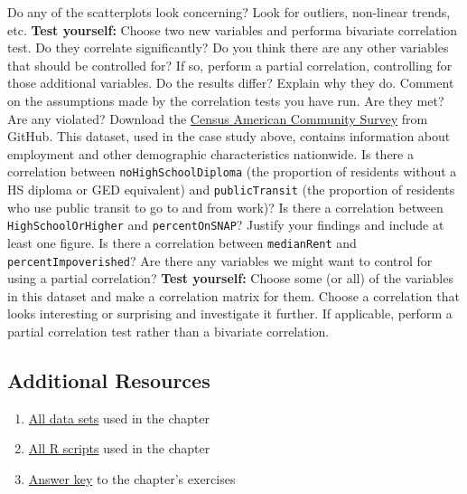 Do any of the scatterplots look concerning? Look for outliers, non-linear trends, etc.
\prob \textbf{Test yourself:} Choose two new variables and performa bivariate correlation test. Do they correlate significantly? Do you think there are any other variables that should be controlled for? If so, perform a partial correlation, controlling for those additional variables. Do the results differ? Explain why they do. Comment on the assumptions made by the correlation tests you have run. Are they met? Are any violated?
\prob Download the \href{https://raw.githubusercontent.com/faulconbridge/appliedStats/master/part2/data/correlationCaseStudy.csv}{Census American Community Survey} from GitHub. This dataset, used in the case study above, contains information about employment and other demographic characteristics nationwide.
\prob Is there a correlation between \verb|noHighSchoolDiploma| (the proportion of residents without a HS diploma or GED equivalent) and \verb|publicTransit| (the proportion of residents who use public transit to go to and from work)?
\prob Is there a correlation between \verb|HighSchoolOrHigher| and \verb|percentOnSNAP|? Justify your findings and include at least one figure.
\prob Is there a correlation between \verb|medianRent| and \verb|percentImpoverished|? Are there any variables we might want to control for using a partial correlation?
\prob \textbf{Test yourself:} Choose some (or all) of the variables in this dataset and make a correlation matrix for them. Choose a correlation that looks interesting or surprising and investigate it further. If applicable, perform a partial correlation test rather than a bivariate correlation.

\subsection{Additional Resources}

\begin{enumerate}
\item \href{data/}{All data sets} used in the chapter
\item \href{RScripts/}{All R scripts} used in the chapter
\item \href{answers/correlation.html}{Answer key} to the chapter's exercises
\end{enumerate}